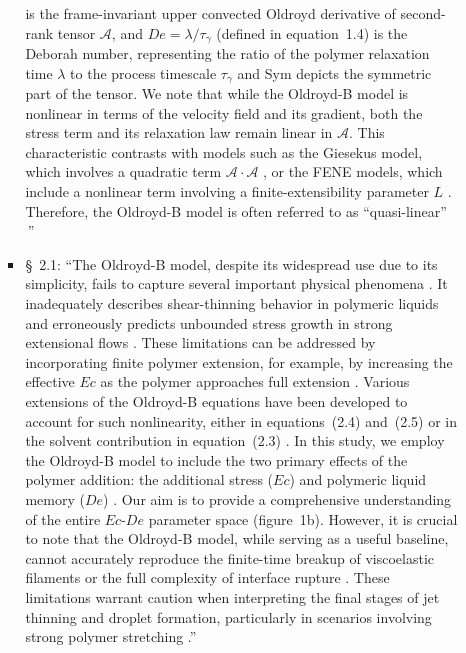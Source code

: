 \documentclass[]{article}
\newcommand{\oo}{\color{magenta} \normalfont}
\newcommand{\bb}{\color{black} \normalfont}
\begin{document}
\begin{enumerate}
\begin{enumerate}
\begin{itemize}
        \noindent is the frame-invariant upper convected Oldroyd derivative of second-rank tensor $\boldsymbol{\mathcal{A}}$, and $De = \lambda/\tau_\gamma$ (defined in equation~1.4) is the Deborah number, representing the ratio of the polymer relaxation time $\lambda$ to the process timescale $\tau_\gamma$ and Sym depicts the symmetric part of the tensor. \oo We note that while the Oldroyd-B model is nonlinear in terms of the velocity field and its gradient, both the stress term and its relaxation law remain linear in $\boldsymbol{\mathcal{A}}$. This characteristic contrasts with models such as the Giesekus model, which involves a quadratic term $\boldsymbol{\mathcal{A}\cdot\mathcal{A}}$ \citep{giesekus1982simple}, or the FENE models, which include a nonlinear term involving a finite-extensibility parameter $L$ \citep{bird1980polymer}. Therefore, the Oldroyd-B model is often referred to as ``quasi-linear”  \citep{davoodi2018secondary, alves2021numerical} \bb\,''
        \item \S~2.1: ``The Oldroyd-B model, despite its widespread use due to its simplicity, fails to capture several important physical phenomena \citep{snoeijer2020relationship}. It inadequately describes shear-thinning behavior in polymeric liquids \citep{yamani2023master} and erroneously predicts unbounded stress growth in strong extensional flows \citep{mckinley2002filament, eggers2020self}. 
        These limitations can be addressed by incorporating finite polymer extension, for example, by increasing the effective $Ec$ as the polymer approaches full extension \citep{hinch2021oldroyd,zinelis2023transition}. Various extensions of the Oldroyd-B equations have been developed to account for such nonlinearity, either in equations~(2.4) and~(2.5) or in the solvent contribution in equation~(2.3) \citep{de1974coil,tanner2000engineering,mckinley2002filament,alves2021numerical}. In this study, we employ the Oldroyd-B model to include the two primary effects of the polymer addition: the additional stress ($Ec$) and polymeric liquid memory ($De$) \citep{snoeijer2020relationship}. Our aim is to provide a comprehensive understanding of the entire $Ec$-$De$ parameter space (figure~1b).
        \oo 
        However, it is crucial to note that the Oldroyd-B model, while serving as a useful baseline, cannot accurately reproduce the finite-time breakup of viscoelastic filaments \citep{eggers2020self} or the full complexity of interface rupture \citep{lohse-2020-pnas}. These limitations warrant caution when interpreting the final stages of jet thinning and droplet formation, particularly in scenarios involving strong polymer stretching\bb.''

\end{itemize}
\end{enumerate}
\end{enumerate}
\end{document}
